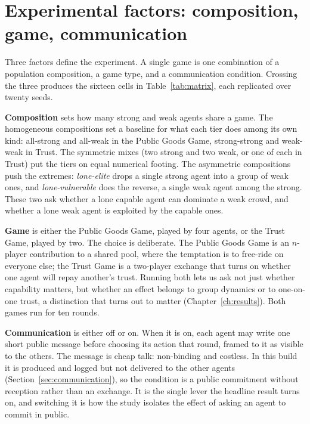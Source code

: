\section{Experimental factors: composition, game, communication}
\label{sec:factors}

Three factors define the experiment. A single game is one combination of a population
composition, a game type, and a communication condition. Crossing the three produces the
sixteen cells in Table~\ref{tab:matrix}, each replicated over twenty seeds.

\textbf{Composition} sets how many strong and weak agents share a game. The homogeneous
compositions set a baseline for what each tier does among its own kind: all-strong and
all-weak in the Public Goods Game, strong-strong and weak-weak in Trust. The symmetric
mixes (two strong and two weak, or one of each in Trust) put the tiers on equal numerical
footing. The asymmetric compositions push the extremes: \emph{lone-elite} drops a single
strong agent into a group of weak ones, and \emph{lone-vulnerable} does the reverse, a
single weak agent among the strong. These two ask whether a lone capable agent can dominate
a weak crowd, and whether a lone weak agent is exploited by the capable ones.

\textbf{Game} is either the Public Goods Game, played by four agents, or the Trust Game,
played by two. The choice is deliberate. The Public Goods Game is an $n$-player contribution
to a shared pool, where the temptation is to free-ride on everyone else; the Trust Game is
a two-player exchange that turns on whether one agent will repay another's trust. Running
both lets us ask not just whether capability matters, but whether an effect belongs to
group dynamics or to one-on-one trust, a distinction that turns out to matter
(Chapter~\ref{ch:results}). Both games run for ten rounds.

\textbf{Communication} is either off or on. When it is on, each agent may write one
short public message before choosing its action that round, framed to it as visible to
the others. The message is cheap talk: non-binding and costless. In this build it is
produced and logged but not delivered to the other agents (Section~\ref{sec:communication}),
so the condition is a public commitment without reception rather than an exchange. It is
the single lever the headline result turns on, and switching it is how the study isolates
the effect of asking an agent to commit in public.

